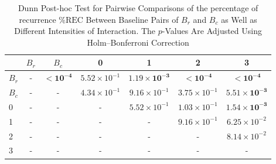\begin{table*}[!t]
\caption{Dunn Post-hoc Test for Pairwise Comparisons of the percentage of recurrence $\%\text{REC}$ Between Baseline Pairs of $B_r$ and $B_c$ as Well as Different Intensities of Interaction. The $p$-Values Are Adjusted Using Holm--Bonferroni Correction\label{tab:dunn_rec}}
\centering
\begin{tabular}{lcccccc}
\toprule
 & $B_r$ & $B_c$ & 0 & 1 & 2 & 3 \\
\midrule
$B_r$ & - & $\mathbf{< 10^{-4}}$ & $5.52 \times 10^{-1}$ & $\mathbf{1.19 \times 10^{-3}}$ & $\mathbf{< 10^{-4}}$ & $\mathbf{< 10^{-4}}$ \\
$B_c$ & - & - & $4.34 \times 10^{-1}$ & $9.16 \times 10^{-1}$ & $3.75 \times 10^{-1}$ & $\mathbf{5.51 \times 10^{-3}}$ \\
0 & - & - & - & $5.52 \times 10^{-1}$ & $1.03 \times 10^{-1}$ & $\mathbf{1.54 \times 10^{-3}}$ \\
1 & - & - & - & - & $9.16 \times 10^{-1}$ & $6.25 \times 10^{-2}$ \\
2 & - & - & - & - & - & $8.14 \times 10^{-2}$ \\
3 & - & - & - & - & - & - \\
\bottomrule
\end{tabular}
\end{table*}
